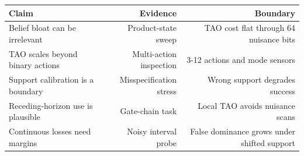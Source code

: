 \begin{tabular}{lrr}
\toprule
Claim & Evidence & Boundary \\
\midrule
Belief bloat can be irrelevant & Product-state sweep & TAO cost flat through 64 nuisance bits \\
TAO scales beyond binary actions & Multi-action inspection & 3-12 actions and mode sensors \\
Support calibration is a boundary & Misspecification stress & Wrong support degrades success \\
Receding-horizon use is plausible & Gate-chain task & Local TAO avoids nuisance scans \\
Continuous losses need margins & Noisy interval probe & False dominance grows under shifted support \\
\bottomrule
\end{tabular}
